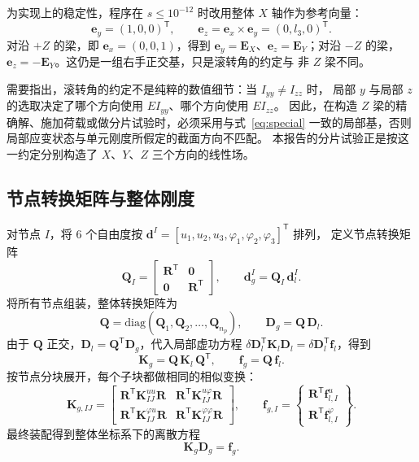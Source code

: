 \documentclass[UTF8,a4paper,11pt]{ctexart}
\newcommand{\bR}{\mathbf{R}}
\newcommand{\bQ}{\mathbf{Q}}
\newcommand{\bK}{\mathbf{K}}
\newcommand{\bd}{\mathbf{d}}
\newcommand{\bD}{\mathbf{D}}
\newcommand{\bff}{\mathbf{f}}
\begin{document}
为实现上的稳定性，程序在 $s\le10^{-12}$ 时改用整体 $X$ 轴作为参考向量：
\begin{equation}\label{eq:special}
\mathbf{e}_y=(1,0,0)^{\mathsf T},\qquad
\mathbf{e}_z=\mathbf{e}_x\times\mathbf{e}_y=(0,l_3,0)^{\mathsf T}.
\end{equation}
对沿 $+Z$ 的梁，即 $\mathbf{e}_x=(0,0,1)$，得到
$\mathbf{e}_y=\mathbf{E}_X$、$\mathbf{e}_z=\mathbf{E}_Y$；对沿 $-Z$ 的梁，
$\mathbf{e}_z=-\mathbf{E}_Y$。这仍是一组右手正交基，只是滚转角的约定与
非 $Z$ 梁不同。

需要指出，滚转角的约定不是纯粹的数值细节：当 $I_{yy}\ne I_{zz}$ 时，
局部 $y$ 与局部 $z$ 的选取决定了哪个方向使用 $EI_{yy}$、哪个方向使用 $EI_{zz}$。
因此，在构造 $Z$ 梁的精确解、施加荷载或做分片试验时，必须采用与式~\eqref{eq:special}
一致的局部基，否则局部应变状态与单元刚度所假定的截面方向不匹配。
本报告的分片试验正是按这一约定分别构造了 $X$、$Y$、$Z$ 三个方向的线性场。

\subsection{节点转换矩阵与整体刚度}

对节点 $I$，将 6 个自由度按
$\bd^I=[u_1,u_2,u_3,\varphi_1,\varphi_2,\varphi_3]^{\mathsf T}$ 排列，
定义节点转换矩阵
\begin{equation}\label{eq:QI}
\bQ_I=\begin{bmatrix}\bR^{\mathsf T}&\mathbf{0}\\\mathbf{0}&\bR^{\mathsf T}\end{bmatrix},
\qquad
\bd_g^I=\bQ_I\,\bd_l^I.
\end{equation}
将所有节点组装，整体转换矩阵为
\begin{equation}
\bQ=\mathrm{diag}\left(\bQ_1,\bQ_2,\ldots,\bQ_{n_p}\right),
\qquad
\bD_g=\bQ\,\bD_l.
\end{equation}
由于 $\bQ$ 正交，$\bD_l=\bQ^{\mathsf T}\bD_g$，代入局部虚功方程
$\delta\bD_l^{\mathsf T}\bK_l\bD_l=\delta\bD_l^{\mathsf T}\bff_l$，得到
\begin{equation}\label{eq:Kglobal}
\boxed{\bK_g=\bQ\,\bK_l\,\bQ^{\mathsf T},\qquad
\bff_g=\bQ\,\bff_l.}
\end{equation}
按节点分块展开，每个子块都做相同的相似变换：
\begin{equation}\label{eq:Kglobal-block}
\bK_{g,IJ}=
\begin{bmatrix}
\bR^{\mathsf T}\bK_{IJ}^{uu}\bR &
\bR^{\mathsf T}\bK_{IJ}^{u\varphi}\bR\\[2pt]
\bR^{\mathsf T}\bK_{IJ}^{\varphi u}\bR &
\bR^{\mathsf T}\bK_{IJ}^{\varphi\varphi}\bR
\end{bmatrix},
\qquad
\bff_{g,I}=
\begin{Bmatrix}
\bR^{\mathsf T}\bff_{l,I}^{u}\\[2pt]
\bR^{\mathsf T}\bff_{l,I}^{\varphi}
\end{Bmatrix}.
\end{equation}
最终装配得到整体坐标系下的离散方程
\begin{equation}\label{eq:final-global}
\bK_g\bD_g=\bff_g.
\end{equation}
\end{document}
